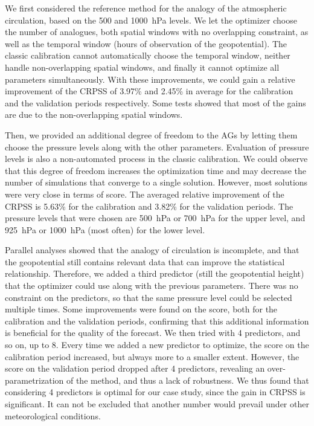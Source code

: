\documentclass[5p]{elsarticle}
\begin{document}
We first considered the reference method for the analogy of the atmospheric circulation, based on the 500 and 1000~hPa levels. We let the optimizer choose the number of analogues, both spatial windows with no overlapping constraint, as well as the temporal window (hours of observation of the geopotential). The classic calibration cannot automatically choose the temporal window, neither handle non-overlapping spatial windows, and finally it cannot optimize all parameters simultaneously. With these improvements, we could gain a relative improvement of the CRPSS of 3.97\% and 2.45\% in average for the calibration and the validation periods respectively. Some tests showed that most of the gains are due to the non-overlapping spatial windows.

Then, we provided an additional degree of freedom to the AGs by letting them choose the pressure levels along with the other parameters. Evaluation of pressure levels is also a non-automated process in the classic calibration. We could observe that this degree of freedom increases the optimization time and may decrease the number of simulations that converge to a single solution. However, most solutions were very close in terms of score. The averaged relative improvement of the CRPSS is 5.63\% for the calibration and 3.82\% for the validation periods. The pressure levels that were chosen are 500~hPa or 700~hPa for the upper level, and 925~hPa or 1000~hPa (most often) for the lower level.

Parallel analyses showed that the analogy of circulation is incomplete, and that the geopotential still contains relevant data that can improve the statistical relationship. Therefore, we added a third predictor (still the geopotential height) that the optimizer could use along with the previous parameters. There was no constraint on the predictors, so that the same pressure level could be selected multiple times. Some improvements were found on the score, both for the calibration and the validation periods, confirming that this additional information is beneficial for the quality of the forecast. We then tried with 4 predictors, and so on, up to 8. Every time we added a new predictor to optimize, the score on the calibration period increased, but always more to a smaller extent. However, the score on the validation period dropped after 4 predictors, revealing an over-parametrization of the method, and thus a lack of robustness. We thus found that considering 4 predictors is optimal for our case study, since the gain in CRPSS is significant. It can not be excluded that another number would prevail under other meteorological conditions.
\end{document}
